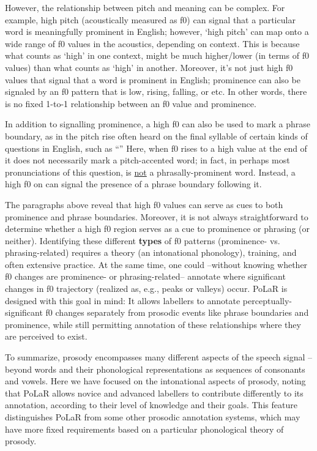 However, the relationship between pitch and meaning can be complex. For example, high pitch (acoustically measured as f0) can signal that a particular word is meaningfully prominent in English; however, ‘high pitch’ can map onto a wide range of f0 values in the acoustics, depending on context. This is because what counts as ‘high’ in one context, might be much higher\slash lower (in terms of f0 values) than what counts as ‘high’ in another. Moreover, it’s not just high f0 values that signal that a word is prominent in English; prominence can also be signaled by an f0 pattern that is low, rising, falling, or etc. In other words, there is no fixed 1-to-1 relationship between an f0 value and prominence.

In addition to signalling prominence, a high f0 can also be used to mark a phrase boundary, as in the pitch rise often heard on the final syllable of certain kinds of questions in English, such as “” Here, when f0 rises to a high value at the end of  it does not necessarily mark a pitch-accented word; in fact, in perhaps most pronunciations of this question,  is \uline{not} a phrasally-prominent word. Instead, a high f0 on  can signal the presence of a phrase boundary following it.

The paragraphs above reveal that high f0 values can serve as cues to both prominence and phrase boundaries. Moreover, it is not always straightforward to determine whether a high f0 region serves as a cue to prominence or phrasing (or neither). Identifying these different \textbf{types} of f0 patterns (prominence- vs. phrasing-related) requires a theory (an intonational phonology), training, and often extensive practice. At the same time, one could --without knowing whether f0 changes are prominence- or phrasing-related-- annotate where significant changes in f0 trajectory (realized as, e.g., peaks or valleys) occur. PoLaR is designed with this goal in mind: It allows labellers to annotate perceptually-significant f0 changes separately from prosodic events like phrase boundaries and prominence, while still permitting annotation of these relationships where they are perceived to exist.

To summarize, prosody encompasses many different aspects of the speech signal -- beyond words and their phonological representations as sequences of consonants and vowels. Here we have focused on the intonational aspects of prosody, noting that PoLaR allows novice and advanced labellers to contribute differently to its annotation, according to their level of knowledge and their goals. This feature distinguishes PoLaR from some other prosodic annotation systems, which may have more fixed requirements based on a particular phonological theory of prosody.

